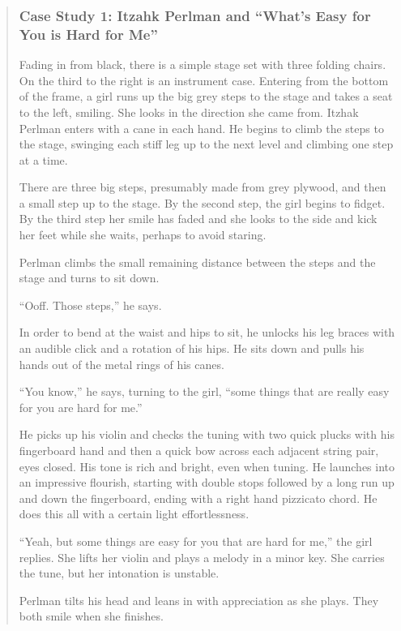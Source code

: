 \documentclass[12pt,letterpaper]{article}
\providecommand{\DIFaddbegin}{} %
\providecommand{\DIFaddend}{} %
\newcommand{\DIFaddincludegraphics}[2][]{{\color{blue}\fbox{\DIFOincludegraphics[#1]{#2}}}} %
\DeclareRobustCommand{\DIFaddbegin}{\DIFOaddbegin \let\includegraphics\DIFaddincludegraphics} %
\DeclareRobustCommand{\DIFaddend}{\DIFOaddend \let\includegraphics\DIFOincludegraphics} %
\begin{document}
	\begin{quote}
	\subsubsection*{Case Study 1: Itzahk Perlman and ``What's Easy for You
	 is Hard for Me''}

	\DIFaddbegin \ttfamily

	\DIFaddend Fading in from black, there is a simple stage set with three folding 
	chairs. On the third to the right is an instrument case. Entering from 
	the bottom of the frame, a girl runs up the big grey steps to the stage 
	and takes a seat to the left, smiling. She looks in the direction she 
	came from. Itzhak Perlman enters with a cane in each hand. He begins 
	to climb the steps to the stage, swinging each stiff leg up to the next
	level and climbing one step at a time. 

	There are three big steps, presumably made from grey plywood, and then a
	small step up to the stage. By the second step, the girl begins to 
	fidget. By the third step her smile has faded and she looks to the side
	and kick her feet while she waits, perhaps to avoid staring.   

	Perlman climbs the small remaining distance between the steps and the 
	stage and turns to sit down. 

	``Ooff. Those steps,'' he says.

	In order to bend at the waist and hips to sit, he unlocks his leg 
	braces with an audible click and a rotation of his hips. He sits down 
	and pulls his hands out of the metal rings of his canes.

	``You know,'' he says, turning to the girl, ``some things that are 
	really easy for you are hard for me.''

	He picks up his violin and checks the tuning with two quick plucks with 
	his fingerboard hand and then a quick bow across each adjacent string
	pair, eyes closed. His tone is rich and bright, even when tuning. He 
	launches into an impressive flourish, starting with double stops 
	followed by a long run up and down the fingerboard, ending with a right
	hand pizzicato chord. He does this all with a certain light 
	effortlessness.

	``Yeah, but some things are easy for you that are hard for me,'' the 
	girl replies. She lifts her violin and plays a melody in a minor key.
	She 
	carries the tune, but her intonation is unstable. 

	Perlman tilts his head and leans in with appreciation as she plays.
	They both smile when she finishes.   

	\end{quote}
\end{document}
